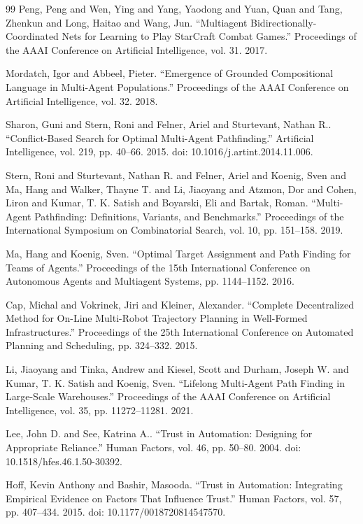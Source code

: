 \documentclass[fleqn,10pt]{wlpeerj}
\begin{document}
\begin{thebibliography}{99}
 Peng, Peng and Wen, Ying and Yang, Yaodong and Yuan, Quan and Tang, Zhenkun and Long, Haitao and Wang, Jun. ``Multiagent Bidirectionally-Coordinated Nets for Learning to Play StarCraft Combat Games.'' Proceedings of the AAAI Conference on Artificial Intelligence, vol. 31. 2017.

 Mordatch, Igor and Abbeel, Pieter. ``Emergence of Grounded Compositional Language in Multi-Agent Populations.'' Proceedings of the AAAI Conference on Artificial Intelligence, vol. 32. 2018.

 Sharon, Guni and Stern, Roni and Felner, Ariel and Sturtevant, Nathan R.. ``Conflict-Based Search for Optimal Multi-Agent Pathfinding.'' Artificial Intelligence, vol. 219, pp. 40--66. 2015. doi: 10.1016/j.artint.2014.11.006.

 Stern, Roni and Sturtevant, Nathan R. and Felner, Ariel and Koenig, Sven and Ma, Hang and Walker, Thayne T. and Li, Jiaoyang and Atzmon, Dor and Cohen, Liron and Kumar, T. K. Satish and Boyarski, Eli and Bartak, Roman. ``Multi-Agent Pathfinding: Definitions, Variants, and Benchmarks.'' Proceedings of the International Symposium on Combinatorial Search, vol. 10, pp. 151--158. 2019.

 Ma, Hang and Koenig, Sven. ``Optimal Target Assignment and Path Finding for Teams of Agents.'' Proceedings of the 15th International Conference on Autonomous Agents and Multiagent Systems, pp. 1144--1152. 2016.

 Cap, Michal and Vokrinek, Jiri and Kleiner, Alexander. ``Complete Decentralized Method for On-Line Multi-Robot Trajectory Planning in Well-Formed Infrastructures.'' Proceedings of the 25th International Conference on Automated Planning and Scheduling, pp. 324--332. 2015.

 Li, Jiaoyang and Tinka, Andrew and Kiesel, Scott and Durham, Joseph W. and Kumar, T. K. Satish and Koenig, Sven. ``Lifelong Multi-Agent Path Finding in Large-Scale Warehouses.'' Proceedings of the AAAI Conference on Artificial Intelligence, vol. 35, pp. 11272--11281. 2021.

 Lee, John D. and See, Katrina A.. ``Trust in Automation: Designing for Appropriate Reliance.'' Human Factors, vol. 46, pp. 50--80. 2004. doi: 10.1518/hfes.46.1.50-30392.

 Hoff, Kevin Anthony and Bashir, Masooda. ``Trust in Automation: Integrating Empirical Evidence on Factors That Influence Trust.'' Human Factors, vol. 57, pp. 407--434. 2015. doi: 10.1177/0018720814547570.


\end{thebibliography}
\end{document}
